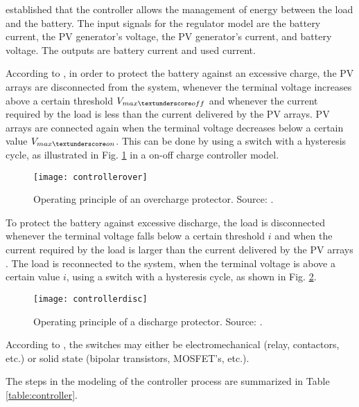 \cite{Mellit} established that the controller allows the management of energy between the load and the battery. The input signals for the regulator model are the battery current, the PV generator's voltage, the PV generator's current, and battery voltage. The outputs are battery current and used current. 

According to \cite{Hansen}, in order to protect the battery against an excessive charge, the PV arrays are disconnected from the system, whenever the terminal voltage increases above a certain threshold $ V_{max \textunderscore off} $ and whenever the current required by the load is less than the current delivered by the PV arrays. PV arrays are connected again when the terminal voltage decreases below a certain value $ V_{max \textunderscore on} $. This can be done by using a switch with a hysteresis cycle, as illustrated in Fig. \ref{fig:controllerover} in a on-off charge controller model.

\begin{figure}[h]
\texttt{[image: controllerover]}
\centering
\caption{Operating principle of an overcharge protector. Source: \cite{Hansen}.}
\label{fig:controllerover}
\end{figure}

To protect the battery against excessive discharge, the load is disconnected whenever the terminal voltage falls below a certain threshold $i$ and when the current required by the load is larger than the current delivered by the PV arrays \cite{Hansen}. The load is reconnected to the system, when the terminal voltage is above a certain value $i$, using a switch with a hysteresis cycle, as shown in Fig. \ref{fig:controllerdisc}. 

\begin{figure}[h]
\texttt{[image: controllerdisc]}
\centering
\caption{Operating principle of a discharge protector. Source: \cite{Hansen}.}
\label{fig:controllerdisc}
\end{figure}

According to \cite{Lorenzo}, the switches may either be electromechanical (relay, contactors, etc.) or solid state (bipolar transistors, MOSFET's, etc.). 

The steps in the modeling of the controller process are summarized in Table \ref{table:controller}.

